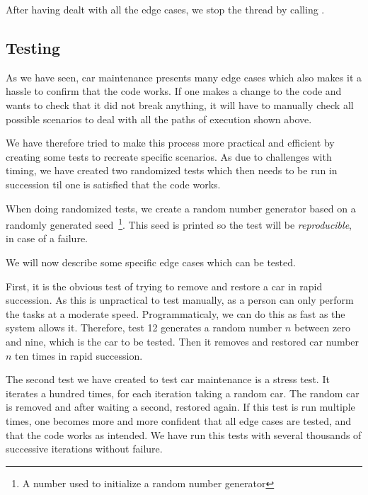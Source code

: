 After having dealt with all the edge cases, we stop the thread by
calling .


\subsection{Testing}
\label{sub:main-test}
As we have seen, car maintenance presents many edge cases which also
makes it a hassle to confirm that the code works. If one makes a
change to the code and wants to check that it did not break anything,
it will have to manually check all possible scenarios to deal with
all the paths of execution shown above.

We have therefore tried to make this process more practical and
efficient by creating some tests to recreate specific scenarios. As
due to challenges with timing, we have created two randomized tests
which then needs to be run in succession til one is satisfied that the
code works.

When doing randomized tests, we create a random number generator based
on a randomly generated seed~\footnote{A number used to initialize a
  random number generator}. This seed is printed so the test will be
\emph{reproducible}, in case of a failure.

We will now describe some specific edge cases which can be tested.

First, it is the obvious test of trying to remove and restore a car in
rapid succession. As this is unpractical to test manually, as a person
can only perform the tasks at a moderate speed. Programmaticaly, we
can do this as fast as the system allows it. Therefore, test 12
generates a random number $n$ between zero and nine, which is the car
to be tested. Then it removes and restored car number $n$ ten times in
rapid succession.

The second test we have created to test car maintenance is a stress
test. It iterates a hundred times, for each iteration taking a random
car. The random car is removed and after waiting a second, restored
again. If this test is run multiple times, one becomes more and more
confident that all edge cases are tested, and that the code works as
intended. We have run this tests with several thousands of successive
iterations without failure.
